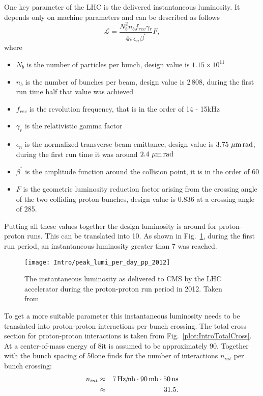 One key parameter of the LHC is the delivered instantaneous luminosity. It depends only on machine parameters and can be described as follows
\begin{equation}
\mathcal{L} = \frac{N_{b}^{2}n_{b}f_{rev}\gamma{}_{r}}{4\pi\epsilon{}_{n}\beta^{^\ast}}F,
\label{eq:Luminosity}
\end{equation}
where
\begin{itemize}
\item{$N_{b}$} is the number of particles per bunch, design value is $1.15 \times 10^{11}$
\item{$n_{b}$} is the number of bunches per beam, design value is 2\,808, during the first run time half that value was achieved
\item{$f_{rev}$} is the revolution frequency, that is in the order of 14 - 15\unit{kHz}
\item{$\gamma_{r}$} is the relativistic gamma factor
\item{$\epsilon{}_{n}$} is the normalized transverse beam emittance, design value is $3.75\,\,\mu\text{m}{}\,\text{rad}$, during the first run time it was around $2.4\,\,\mu\text{m}{}\,\text{rad}$
\item{$\beta^{^\ast}$} is the amplitude function around the collision point, it is in the order of 60\cm{}
\item{$F$} is the geometric luminosity reduction factor arising from the crossing angle of the two colliding proton bunches, design value is 0.836 at a crossing angle of 285\murad{}.
\end{itemize}

Putting all these values together the design luminosity is around \LHigh{} for proton-proton runs. This can be translated into 10\hertzpernbarn{}. As shown in Fig.~\ref{plot:IntroInstLumi}, during the first run period, an instantaneous luminosity greater than 7\hertzpernbarn{} was reached.

\begin{figure}[Htb]
  \centering
  \texttt{[image: Intro/peak\_lumi\_per\_day\_pp\_2012]}
  \caption[Instantaneous luminosity at CMS]{The instantaneous luminosity as delivered to CMS by the LHC accelerator during the proton-proton run period in 2012. Taken from~\cite{CMS-Lumi-Public-Webpage} \label{plot:IntroInstLumi}}
\end{figure}

To get  a more suitable parameter this instantaneous luminosity needs to be translated into proton-proton interactions per bunch crossing. The total cross section for proton-proton interactions is taken from Fig.~\ref{plot:IntroTotalCross}. At a center-of-mass energy of 8\TeV it is assumed to be approximately 90\mb. Together with the bunch spacing of 50\ns one finds for the number of interactions $n_{int}$ per bunch crossing:
\begin{eqnarray}
n_{int} & \approx & 7\, \text{Hz\hspace{-0.08em}/\hspace{-0.16em}}\text{nb} \cdot 90\,\text{mb} \cdot 50\,\text{ns} \nonumber \\
 & \approx & 31.5 \nonumber.
\end{eqnarray}

